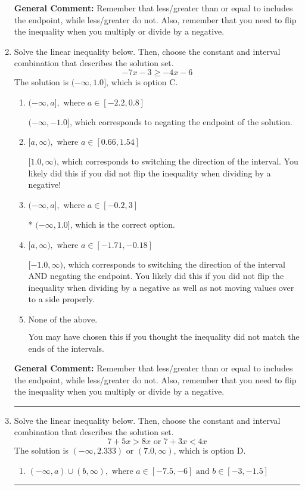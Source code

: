 \documentclass{extbook}[14pt]
\newcommand{\litem}[1]{\item #1

\rule{\textwidth}{0.4pt}}
\begin{document}
\begin{enumerate}
{\textbf{General Comment:} Remember that less/greater than or equal to includes the endpoint, while less/greater do not. Also, remember that you need to flip the inequality when you multiply or divide by a negative.
}
\litem{
Solve the linear inequality below. Then, choose the constant and interval combination that describes the solution set.
\[ -7x -3 \geq -4x -6 \]The solution is \( (-\infty, 1.0] \), which is option C.\begin{enumerate}[label=\Alph*.]
\item \( (-\infty, a], \text{ where } a \in [-2.2, 0.8] \)

 $(-\infty, -1.0]$, which corresponds to negating the endpoint of the solution.
\item \( [a, \infty), \text{ where } a \in [0.66, 1.54] \)

 $[1.0, \infty)$, which corresponds to switching the direction of the interval. You likely did this if you did not flip the inequality when dividing by a negative!
\item \( (-\infty, a], \text{ where } a \in [-0.2, 3] \)

* $(-\infty, 1.0]$, which is the correct option.
\item \( [a, \infty), \text{ where } a \in [-1.71, -0.18] \)

 $[-1.0, \infty)$, which corresponds to switching the direction of the interval AND negating the endpoint. You likely did this if you did not flip the inequality when dividing by a negative as well as not moving values over to a side properly.
\item \( \text{None of the above}. \)

You may have chosen this if you thought the inequality did not match the ends of the intervals.
\end{enumerate}

\textbf{General Comment:} Remember that less/greater than or equal to includes the endpoint, while less/greater do not. Also, remember that you need to flip the inequality when you multiply or divide by a negative.
}
\litem{
Solve the linear inequality below. Then, choose the constant and interval combination that describes the solution set.
\[ 7 + 5 x > 8 x \text{ or } 7 + 3 x < 4 x \]The solution is \( (-\infty, 2.333) \text{ or } (7.0, \infty) \), which is option D.\begin{enumerate}[label=\Alph*.]
\item \( (-\infty, a) \cup (b, \infty), \text{ where } a \in [-7.5, -6] \text{ and } b \in [-3, -1.5] \)


\end{enumerate}}
\end{enumerate}
\end{document}

